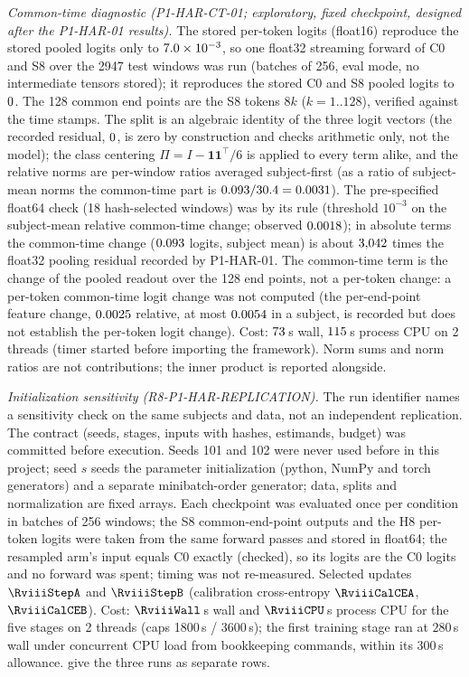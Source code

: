 \documentclass{article}
\theoremstyle{plain}
\theoremstyle{definition}
\theoremstyle{remark}
\begin{document}
\emph{Common-time diagnostic (P1-HAR-CT-01; exploratory, fixed checkpoint, designed after the P1-HAR-01 results).} The stored per-token logits (float16) reproduce the stored pooled logits only to $7.0\times10^{-3}$, so one float32 streaming forward of C0 and S8 over the 2947 test windows was run (batches of 256, eval mode, no intermediate tensors stored); it reproduces the stored C0 and S8 pooled logits to $0$. The 128 common end points are the S8 tokens $8k$ ($k=1..128$), verified against the time stamps. The split is an algebraic identity of the three logit vectors (the recorded residual, $0$, is zero by construction and checks arithmetic only, not the model); the class centering $\Pi=I-\mathbf{1}\mathbf{1}^{\top}/6$ is applied to every term alike, and the relative norms are per-window ratios averaged subject-first (as a ratio of subject-mean norms the common-time part is $0.093/30.4=0.0031$). The pre-specified float64 check (18 hash-selected windows) was \texttt{\HarCtFpSixtyFour} by its rule (threshold $10^{-3}$ on the subject-mean relative common-time change; observed $0.0018$); in absolute terms the common-time change ($0.093$ logits, subject mean) is about $3{,}042$ times the float32 pooling residual recorded by P1-HAR-01. The common-time term is the change of the pooled readout over the 128 end points, not a per-token change: a per-token common-time logit change was not computed (the per-end-point feature change, $0.0025$ relative, at most $0.0054$ in a subject, is recorded but does not establish the per-token logit change). Cost: $73$\,s wall, $115$\,s process CPU on 2 threads (timer started before importing the framework). Norm sums and norm ratios are not contributions; the inner product is reported alongside.



\emph{Initialization sensitivity (R8-P1-HAR-REPLICATION).} The run identifier names a sensitivity check on the same subjects and data, not an independent replication. The contract (seeds, stages, inputs with hashes, estimands, budget) was committed before execution. Seeds 101 and 102 were never used before in this project; seed $s$ seeds the parameter initialization (python, NumPy and torch generators) and a separate minibatch-order generator; data, splits and normalization are fixed arrays. Each checkpoint was evaluated once per condition in batches of 256 windows; the S8 common-end-point outputs and the H8 per-token logits were taken from the same forward passes and stored in float64; the resampled arm's input equals C0 exactly (checked), so its logits are the C0 logits and no forward was spent; timing was not re-measured. Selected updates $\RviiiStepA$ and $\RviiiStepB$ (calibration cross-entropy $\RviiiCalCEA$, $\RviiiCalCEB$). Cost: $\RviiiWall$\,s wall and $\RviiiCPU$\,s process CPU for the five stages on 2 threads (caps 1800\,s / 3600\,s); the first training stage ran at $280$\,s wall under concurrent CPU load from bookkeeping commands, within its 300\,s allowance.  give the three runs as separate rows.
\end{document}
